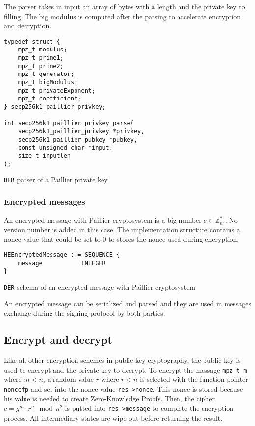 The parser takes in input an array of bytes with a length and the private key to
filling. The big modulus is computed after the parsing to accelerate encryption
and decryption.

\begin{listing}
  \begin{verbatim}
typedef struct {
    mpz_t modulus;
    mpz_t prime1;
    mpz_t prime2;
    mpz_t generator;
    mpz_t bigModulus;
    mpz_t privateExponent;
    mpz_t coefficient;
} secp256k1_paillier_privkey;

int secp256k1_paillier_privkey_parse(
    secp256k1_paillier_privkey *privkey,
    secp256k1_paillier_pubkey *pubkey,
    const unsigned char *input,
    size_t inputlen
);
  \end{verbatim}
	\caption{\texttt{DER} parser of a Paillier private key}
	\label{lst:DERImplPaillierParsePriv}
\end{listing}

\subsubsection{Encrypted messages}

An encrypted message with Paillier cryptosystem is a big number $c \in
\mathbb{Z}_{n^2}^*$. No version number is added in this case. The implementation
structure contains a nonce value that could be set to 0 to stores the nonce used
during encryption.

\begin{listing}
  \begin{verbatim}
HEEncryptedMessage ::= SEQUENCE {
    message           INTEGER
}
  \end{verbatim}
	\caption{\texttt{DER} schema of an encrypted message with Paillier cryptosystem}
	\label{lst:DERSchemaPaillierEncMessage}
\end{listing}

An encrypted message can be serialized and parsed and they are used in messages
exchange during the signing protocol by both parties.

\subsection{Encrypt and decrypt}

Like all other encryption schemes in public key cryptography, the public key is
used to encrypt and the private key to decrypt. To encrypt the message
\texttt{mpz\_t m} where $m < n$, a random value $r$ where $r < n$ is selected
with the function pointer \texttt{noncefp} and set into the nonce value
\texttt{res->nonce}. This nonce is stored because his value is needed to create
Zero-Knowledge Proofs. Then, the cipher $c = g^m \cdot r^n \mod n^2$ is putted
into \texttt{res->message} to complete the encryption process. All intermediary
states are wipe out before returning the result.

